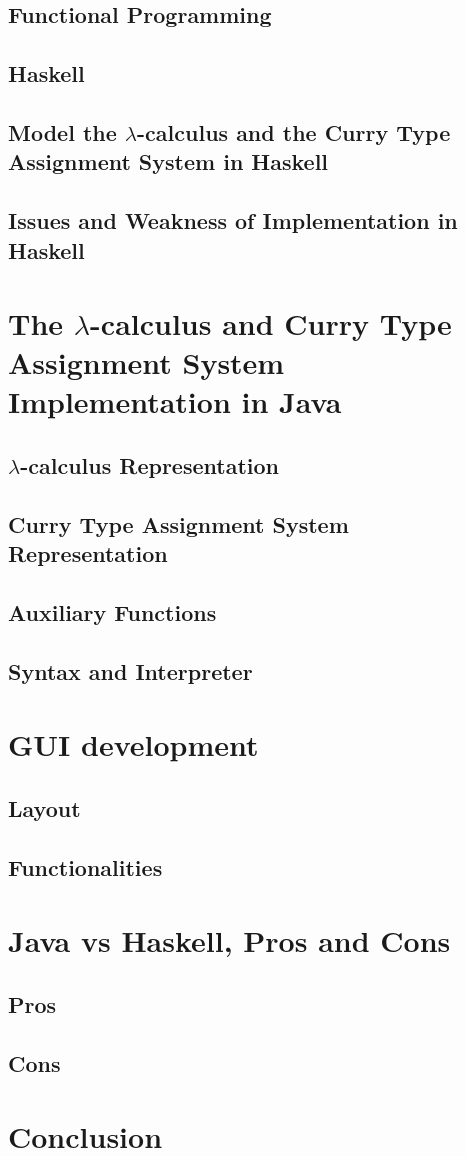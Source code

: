 \documentclass[a4paper,11pt,twoside]{report}
\begin{document}
\section{Functional Programming}
\section{Haskell}
\section{Model the $\lambda$-calculus and the Curry Type Assignment System in Haskell}
\section{Issues and Weakness of Implementation in Haskell }


\chapter{The $\lambda$-calculus and Curry Type Assignment System Implementation in Java}

\section{$\lambda$-calculus Representation}

\section{Curry Type Assignment System Representation}

\section{Auxiliary Functions}

\section{Syntax and Interpreter}

\chapter{GUI development}

\section{Layout}

\section{Functionalities}

\chapter{Java vs Haskell, Pros and Cons}

\section{Pros}

\section{Cons}

\chapter{Conclusion}
\end{document}
